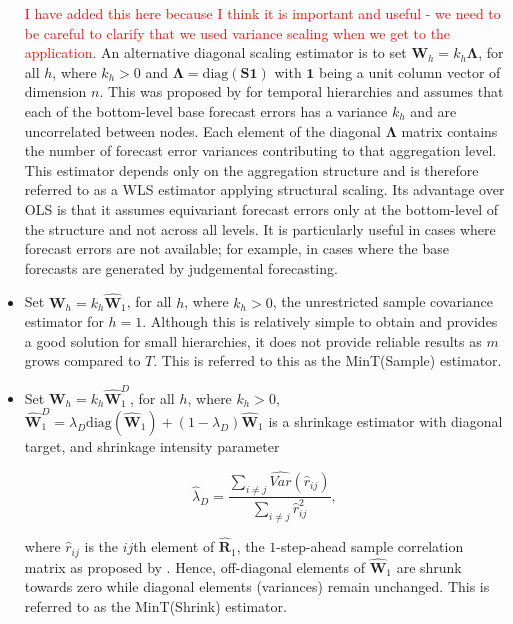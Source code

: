 \documentclass[graybox]{svmult}
\begin{document}
\begin{itemize}
        \textcolor{red}{I have added this here because I think it is important and useful - we need to be careful to clarify that we used variance scaling when we get to the application.} An alternative diagonal scaling estimator is to set $\bm{W}_{h}=k_{h}\bm{\Lambda}$, for all $h$, where $k_{h} > 0$ and $\bm{\Lambda}=\text{diag}(\bm{S}\bm{1})$ with $\bm{1}$ being a unit column vector of dimension $n$. This was proposed by \citet{AthEtAl2017} for temporal hierarchies and assumes that each of the bottom-level base forecast errors has a variance $k_{h}$ and are uncorrelated between nodes. Each element of the diagonal $\bm{\Lambda}$ matrix contains the number of forecast error variances contributing to that aggregation level. This estimator depends only on the aggregation structure and is therefore referred to as a WLS estimator applying structural scaling. Its advantage over OLS is that it assumes equivariant forecast errors only at the bottom-level of the structure and not across all levels. It is particularly useful in cases where forecast errors are not available; for example, in cases where the base forecasts are generated by judgemental forecasting.
                
    \item  Set $\bm{W}_{h}=k_{h}\hat{\bm{W}}_{1}$, for all $h$, where $k_{h} > 0$, the unrestricted sample covariance estimator for $h=1$. Although this is relatively simple to obtain and provides a good solution for small hierarchies, it does not provide reliable results as $m$ grows compared to $T$. This is referred to this as the MinT(Sample) estimator.
    \item Set $\bm{W}_{h}=k_{h}\hat{\bm{W}}_{1}^D$, for all $h$, where $k_{h} > 0$, $\hat{\bm{W}}^{D}_{1} = \lambda_{D} \text{diag}(\hat{\bm{W}}_{1}) + (1 - \lambda_{D})\hat{\bm{W}}_{1}$ is a shrinkage estimator with diagonal target, and shrinkage intensity parameter

        $$\hat{\lambda}_{D} = \frac{\sum_{i \ne j}\hat{Var}(\hat{r}_{ij})}{\sum_{i \ne j}\hat{r}_{ij}^2},$$


        where $\hat{r}_{ij}$ is the $ij$th element of $\hat{\bm{R}}_{1}$, the $1$-step-ahead sample correlation matrix as proposed by \citet{Schafer2005}. Hence, off-diagonal elements of $\hat{\bm{W}}_1$ are shrunk towards zero while diagonal elements (variances) remain unchanged. This is referred to as the MinT(Shrink) estimator.
\end{itemize}
\end{document}

